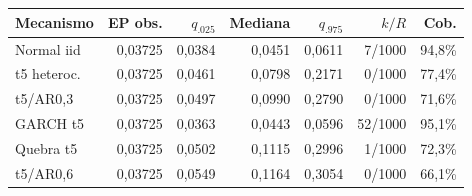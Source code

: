 \begin{tabular}{lrrrrrr}
\toprule
Mecanismo & EP obs. & $q_{.025}$ & Mediana & $q_{.975}$ & $k/R$ & Cob.\\
\midrule
Normal iid & 0,03725 & 0,0384 & 0,0451 & 0,0611 & 7/1000 & 94,8\%\\
t5 heteroc. & 0,03725 & 0,0461 & 0,0798 & 0,2171 & 0/1000 & 77,4\%\\
t5/AR0,3 & 0,03725 & 0,0497 & 0,0990 & 0,2790 & 0/1000 & 71,6\%\\
GARCH t5 & 0,03725 & 0,0363 & 0,0443 & 0,0596 & 52/1000 & 95,1\%\\
Quebra t5 & 0,03725 & 0,0502 & 0,1115 & 0,2996 & 1/1000 & 72,3\%\\
t5/AR0,6 & 0,03725 & 0,0549 & 0,1164 & 0,3054 & 0/1000 & 66,1\%\\
\bottomrule
\end{tabular}
